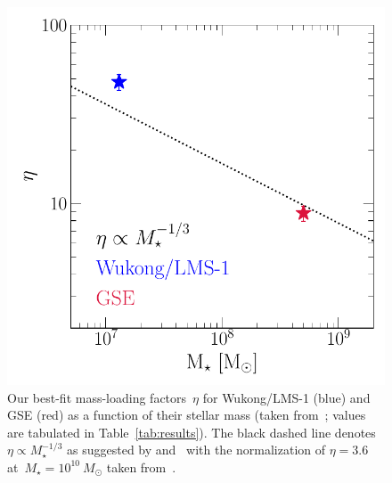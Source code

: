 \begin{figure}
\centering
\includegraphics[scale = 0.6]{gse_wukong_eta.pdf}
\caption{
Our best-fit mass-loading factors~$\eta$ for Wukong/LMS-1 (blue) and GSE (red) as
a function of their stellar mass (taken from~\citealt{Naidu2022}; values are
tabulated in Table~\ref{tab:results}).
The black dashed line denotes~$\eta \propto M_\star^{-1/3}$ as suggested by
\citet{Finlator2008} and~\citet{Peeples2011} with the normalization of
$\eta = 3.6$ at~$M_\star = 10^{10}~M_\odot$ taken from~\citet{Muratov2015}.
}
\label{fig:gse_wukong_eta}
\end{figure}

